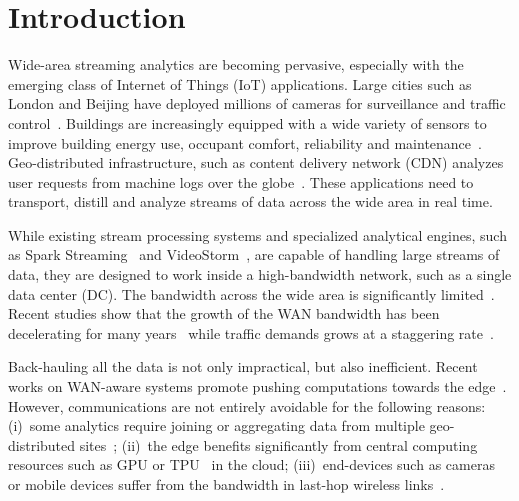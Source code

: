 \section{Introduction}

Wide-area streaming analytics are becoming pervasive, especially with the
emerging class of Internet of Things (IoT) applications.  Large cities such as
London and Beijing have deployed millions of cameras for surveillance and
traffic control~\cite{london.surveillance, skynet}. Buildings are increasingly
equipped with a wide variety of sensors to improve building energy use, occupant
comfort, reliability and
maintenance~\cite{krioukov2012building}. Geo-distributed infrastructure, such as
content delivery network (CDN) analyzes user requests from machine logs over the
globe~\cite{mukerjee2015practical}. These applications need to transport,
distill and analyze streams of data across the wide area in real time.

While existing stream processing systems and specialized analytical engines,
such as Spark Streaming~\cite{zaharia2013discretized} and
VideoStorm~\cite{zhang2017live}, are capable of handling large streams of data,
they are designed to work inside a high-bandwidth network, such as a single data
center (DC). The bandwidth across the wide area is significantly
limited~\cite{hsieh17gaia, vulimiri2015global}. Recent studies show that the
growth of the WAN bandwidth has been decelerating for many
years~\cite{global2016telegeography} while traffic demands grows at a staggering
rate~\cite{index2013zettabyte}.

Back-hauling all the data is not only impractical, but also inefficient. Recent
works on WAN-aware systems promote pushing computations towards the
edge~\cite{satyanarayanan2009case, rabkin2014aggregation, pu2015low}. However,
communications are not entirely avoidable for the following reasons: (i)~some
analytics require joining or aggregating data from multiple geo-distributed
sites~\cite{pu2015low, viswanathan2016clarinet}; (ii)~the edge benefits
significantly from central computing resources such as GPU or
TPU~\cite{abadi2016tensorflow} in the cloud; (iii)~end-devices such as cameras
or mobile devices suffer from the bandwidth in last-hop wireless
links~\cite{zhang2015design, abari2017enabling}.


